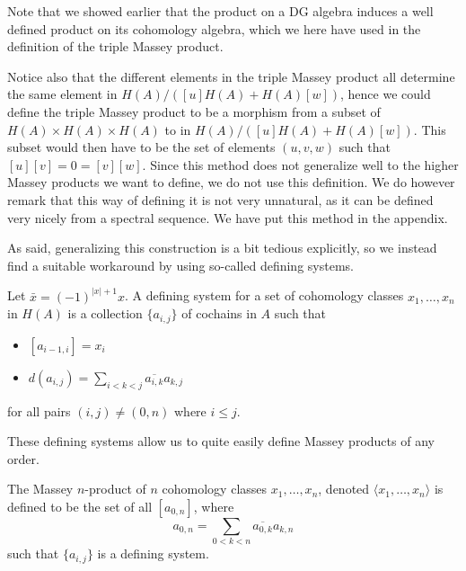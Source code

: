 \begin{remark}
Note that we showed earlier that the product on a DG algebra induces a well defined product on its cohomology algebra, which we here have used in the definition of the triple Massey product.  
\end{remark}

Notice also that the different elements in the triple Massey product all determine the same element in $H(A)/([u]H(A)+H(A)[w])$, hence we could define the triple Massey product to be a morphism from a subset of $H(A)\times H(A)\times H(A)$ to in $H(A)/([u]H(A)+H(A)[w])$. This subset would then have to be the set of elements $(u, v, w)$ such that $[u][v] = 0 = [v][w]$. Since this method does not generalize well to the higher Massey products we want to define, we do not use this definition. We do however remark that this way of defining it is not very unnatural, as it can be defined very nicely from a spectral sequence. We have put this method in the appendix. 

As said, generalizing this construction is a bit tedious explicitly, so we instead find a suitable workaround by using so-called defining systems. 

\begin{definition}
Let $\bar{x} = (-1)^{|x|+1}x$. A defining system for a set of cohomology classes $x_1, \ldots, x_n$ in $ H(A)$ is a collection $\{ a_{i,j}\}$ of cochains in $A$ such that
\begin{itemize}
    \item $[a_{i-1, i}] = x_i$
    \item $d(a_{i, j}) = \sum_{i<k<j}\overline{a_{i, k}}a_{k, j}$
\end{itemize}
for all pairs $(i,j)\neq (0,n)$ where $i\leq j$.
\end{definition}

These defining systems allow us to quite easily define Massey products of any order. 

\begin{definition}
The Massey $n$-product of $n$ cohomology classes $x_1, \ldots, x_n$, denoted $\langle x_1, \ldots, x_n\rangle$ is defined to be the set of all $[a_{0,n}]$, where
\begin{equation*}
    a_{0,n} = \sum_{0<k<n}\overline{a_{0, k}}a_{k, n}
\end{equation*}
such that $\{ a_{i,j} \}$ is a defining system.
\end{definition}

